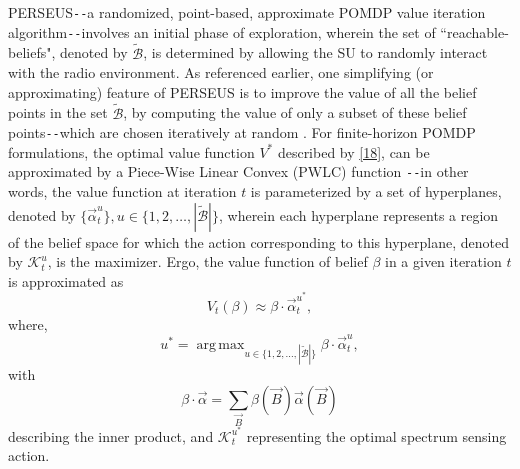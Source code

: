 \documentclass[12pt, draftcls, onecolumn]{IEEEtran}
\DeclareMathOperator*{\argmax}{arg\,max}
\begin{document}
PERSEUS\texttt{-{}-}a randomized, point-based, approximate POMDP value iteration algorithm\texttt{-{}-}involves an initial phase of exploration, wherein the set of ``reachable-beliefs", denoted by $\tilde{\mathcal{B}}$, is determined by allowing the SU to randomly interact with the radio environment. As referenced earlier, one simplifying (or approximating) feature of PERSEUS is to improve the value of all the belief points in the set $\tilde{\mathcal{B}}$, by computing the value of only a subset of these belief points\texttt{-{}-}which are chosen iteratively at random \cite{WCL:paper}. For finite-horizon POMDP formulations, the optimal value function $V^{*}$ described by \eqref{18}, can be approximated by a Piece-Wise Linear Convex (PWLC) function \cite{WCL:13}\texttt{-{}-}in other words, the value function at iteration $t$ is parameterized by a set of hyperplanes, denoted by $\{\vec{\alpha}_{t}^{u}\},u{\in}\{1,2,\dots,|\tilde{\mathcal{B}}|\}$, wherein each hyperplane represents a region of the belief space for which the action corresponding to this hyperplane, denoted by $\mathcal{K}_{t}^{u}$, is the maximizer. Ergo, the value function of belief $\beta$ in a given iteration $t$ is approximated as
\begin{equation}\label{22}
    V_{t}(\beta) \approx \beta \cdot \vec{\alpha}_{t}^{u^{*}},
\end{equation}
where,
\begin{equation}\label{23}
    u^{*}=\argmax_{u \in \{1,2,\dots,|\tilde{\mathcal{B}}|\}}\beta \cdot \vec{\alpha}_{t}^{u},
\end{equation}
with
\begin{equation}\label{24}
    \beta \cdot \vec{\alpha}=\sum_{\vec{B}}\beta(\vec{B})\vec{\alpha}(\vec{B})
\end{equation}
describing the inner product, and $\mathcal{K}_{t}^{u^{*}}$ representing the optimal spectrum sensing action.
\end{document}
